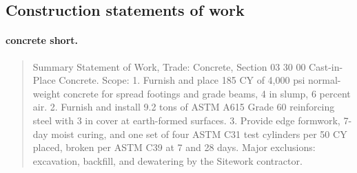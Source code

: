 \subsection{Construction statements of work}

\paragraph{concrete short.}
\begin{quote}\small Summary Statement of Work, Trade: Concrete, Section 03 30 00 Cast-in-Place Concrete. Scope: 1. Furnish and place 185 CY of 4,000 psi normal-weight concrete for spread footings and grade beams, 4 in slump, 6 percent air. 2. Furnish and install 9.2 tons of ASTM A615 Grade 60 reinforcing steel with 3 in cover at earth-formed surfaces. 3. Provide edge formwork, 7-day moist curing, and one set of four ASTM C31 test cylinders per 50 CY placed, broken per ASTM C39 at 7 and 28 days. Major exclusions: excavation, backfill, and dewatering by the Sitework contractor.\end{quote}

